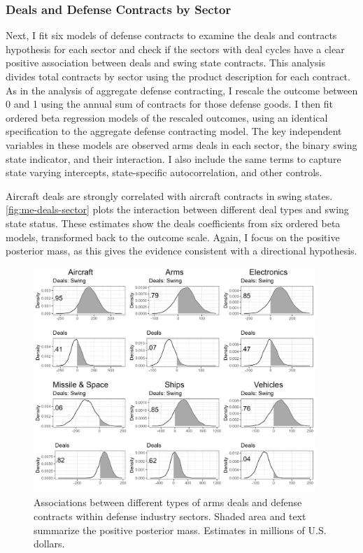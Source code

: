 \documentclass[12pt]{article}
\begin{document}
\subsubsection{Deals and Defense Contracts by Sector}


Next, I fit six models of defense contracts to examine the deals and contracts hypothesis for each sector and check if the sectors with deal cycles have a clear positive association between deals and swing state contracts. 
This analysis divides total contracts by sector using the product description for each contract. 
As in the analysis of aggregate defense contracting, I rescale the outcome between 0 and 1 using the annual sum of contracts for those defense goods. 
I then fit ordered beta regression models of the rescaled outcomes, using an identical specification to the aggregate defense contracting model.
The key independent variables in these models are observed arms deals in each sector, the binary swing state indicator, and their interaction. 
I also include the same terms to capture state varying intercepts, state-specific autocorrelation, and other controls. 


Aircraft deals are strongly correlated with aircraft contracts in swing states. 
\autoref{fig:me-deals-sector} plots the interaction between different deal types and swing state status.  
These estimates show the deals coefficients from six ordered beta models, transformed back to the outcome scale. 
Again, I focus on the positive posterior mass, as this gives the evidence consistent with a directional hypothesis.


\begin{figure}[htpb]
	\centering
		\includegraphics[width=0.95\textwidth]{../figures/me-deals-sector.png}
	\caption{Associations between different types of arms deals and defense contracts within defense industry sectors. Shaded area and text summarize the positive posterior mass. Estimates in millions of U.S. dollars.}
	\label{fig:me-deals-sector}
\end{figure}
\end{document}
